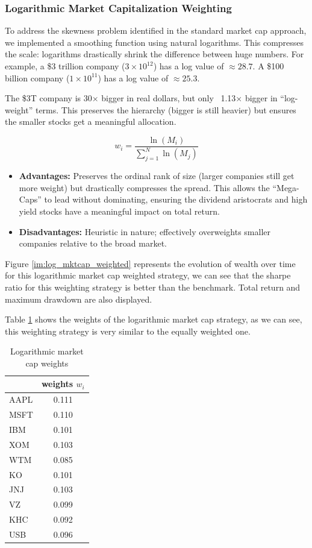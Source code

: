 \documentclass[12pt, a4paper]{article}
\begin{document}
	\subsubsection{Logarithmic Market Capitalization Weighting}
	To address the skewness problem identified in the standard market cap approach, we implemented a smoothing function using natural logarithms. This compresses the scale: logarithms drastically shrink the difference between huge numbers. For example, a \$3 trillion company ($3 \times 10^{12}$) has a log value of $\approx 28.7$. A \$100 billion company ($1 \times 10^{11}$) has a log value of $\approx 25.3$.
	
	The \$3T company is 30$\times$ bigger in real dollars, but only ~1.13$\times$ bigger in ``log-weight'' terms. This preserves the hierarchy (bigger is still heavier) but ensures the smaller stocks get a meaningful allocation.
	
	\begin{equation}
		w_i = \frac{\ln(M_i)}{\sum_{j=1}^{N} \ln(M_j)}
	\end{equation}
	\begin{itemize}
		\item \textbf{Advantages:} Preserves the ordinal rank of size (larger companies still get more weight) but drastically compresses the spread. This allows the ``Mega-Caps'' to lead without dominating, ensuring the dividend aristocrats and high yield stocks have a meaningful impact on total return.
		\item \textbf{Disadvantages:} Heuristic in nature; effectively overweights smaller companies relative to the broad market.
	\end{itemize}
	
	Figure \ref{im:log_mktcap_weighted} represents the evolution of wealth over time for this logarithmic market cap weighted strategy, we can see that the sharpe ratio for this weighting strategy is better than the benchmark. Total return and maximum drawdown are also displayed. 
	
	Table \ref{tbl:log_weights} shows the weights of the logarithmic market cap strategy, as we can see, this weighting strategy is very similar to the equally weighted one. 
	
	\begin{table}[h]
		\centering
		\begin{tabular}{lc}
			\toprule
			& weights $w_i$ \\
			\midrule
			AAPL & 0.111 \\
			MSFT & 0.110 \\
			IBM & 0.101 \\
			XOM & 0.103 \\
			WTM & 0.085 \\
			KO & 0.101 \\
			JNJ & 0.103 \\
			VZ & 0.099 \\
			KHC & 0.092 \\
			USB & 0.096 \\
			\bottomrule
		\end{tabular}
		\caption{Logarithmic market cap weights}
		\label{tbl:log_weights}
	\end{table}
	
\end{document}
